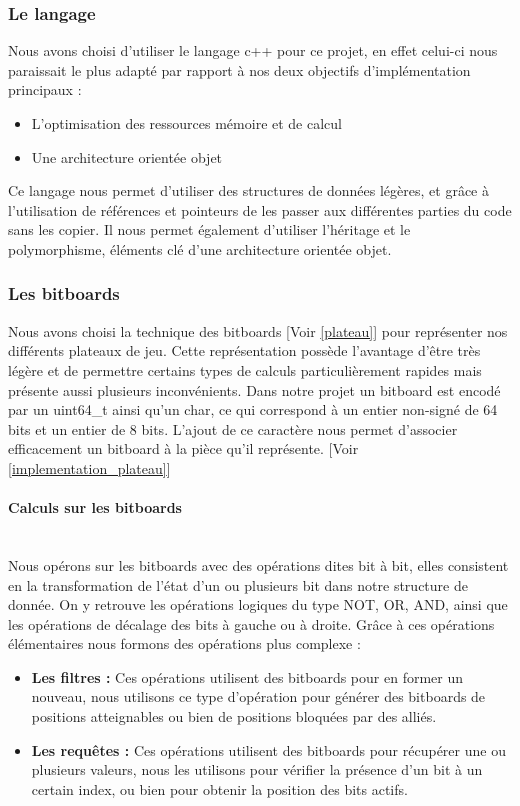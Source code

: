 \huge\documentclass{article}
\begin{document}
    \subsubsection{Le langage}

    Nous avons choisi d'utiliser le langage c++ pour ce projet, en effet celui-ci nous paraissait le plus adapté par rapport à nos deux objectifs d'implémentation principaux   :
    \begin{itemize}
        \item L'optimisation des ressources mémoire et de calcul
        \item Une architecture orientée objet
    \end{itemize}
    Ce langage nous permet d'utiliser des structures de données légères, et grâce à l'utilisation de références et pointeurs de les passer aux différentes parties du code sans les copier.
    Il nous permet également d'utiliser l'héritage et le polymorphisme, éléments clé d'une architecture orientée objet.

    \subsubsection{Les bitboards} \newline
    Nous avons choisi la technique des bitboards [Voir \ref{plateau}] pour représenter nos différents plateaux de jeu.
    Cette représentation possède l'avantage d'être très légère et de permettre certains types de calculs particulièrement rapides mais présente aussi plusieurs inconvénients.
    Dans notre projet un bitboard est encodé par un uint64\_t ainsi qu'un char, ce qui correspond à un entier non-signé de 64 bits et un entier de 8 bits.
    L'ajout de ce caractère nous permet d'associer efficacement un bitboard à la pièce qu'il représente. [Voir \ref{implementation_plateau}]
    \paragraph{Calculs sur les bitboards} \label{calculs_sur_les_bitboards}
    ~~\\
    Nous opérons sur les bitboards avec des opérations dites bit à bit, elles consistent en la transformation de l'état d'un ou plusieurs bit dans notre structure de donnée.
    On y retrouve les opérations logiques du type NOT, OR, AND, ainsi que les opérations de décalage des bits à gauche ou à droite.
    Grâce à ces opérations élémentaires nous formons des opérations plus complexe :
    \begin{itemize}
        \item \textbf{Les filtres : }
        Ces opérations utilisent des bitboards pour en former un nouveau, nous utilisons ce type d'opération pour générer des bitboards de positions atteignables ou bien de positions bloquées par des alliés.
        \item \textbf{Les requêtes : }
        Ces opérations utilisent des bitboards pour récupérer une ou plusieurs valeurs, nous les utilisons pour vérifier la présence d'un bit à un certain index, ou bien pour obtenir la position des bits actifs.
    \end{itemize}
\end{document}

